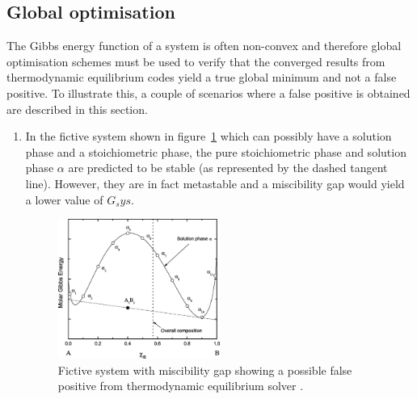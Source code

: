 	\subsection{Global optimisation}\label{sec:opt_theory}
	The Gibbs energy function of a system is often non-convex and therefore global optimisation schemes must be used to verify that the converged results from thermodynamic equilibrium codes yield a true global minimum and not a false positive. To illustrate this, a couple of scenarios where a false positive is obtained are described in this section.
	\begin{enumerate}
		\item In the fictive system shown in figure~\ref{fig:go1} which can possibly have a solution phase and a stoichiometric phase, the pure stoichiometric phase  and solution phase $\alpha$ are predicted to be stable (as represented by the dashed tangent line). However, they are in fact metastable and a miscibility gap would yield a lower value of $G_sys$.
		\begin{figure}[htbp]
		\centering
		\includegraphics[width=0.5\textwidth]{figures/Global_opt1}
		\caption{Fictive system with miscibility gap showing a possible false positive from thermodynamic equilibrium solver \cite{Piro16}.}
		\label{fig:go1}
	\end{figure}
	

\end{enumerate}
